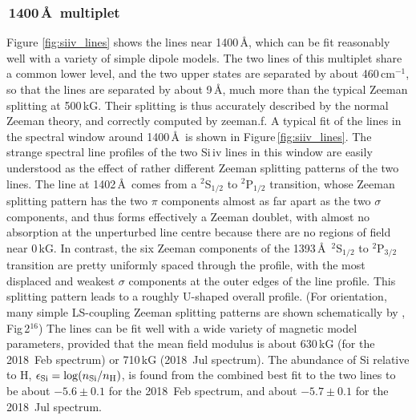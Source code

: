 \documentclass[fleqn,usenatbib]{mnras}
\begin{document}
\subsubsection{\,1400\,\AA\ multiplet}
\label{sec: siiv}
Figure \ref{fig:siiv_lines} shows the  lines near 1400\,\AA, which can be fit reasonably well with a variety of simple dipole models. The two lines of this multiplet share a common lower level, and the two upper states are separated by about 460\,cm$^{-1}$, so that the lines are separated by about 9\,\AA, much more than the typical Zeeman splitting at 500\,kG. Their splitting is thus accurately described by the normal Zeeman theory, and correctly computed by {\sc zeeman.f}. A typical fit of the lines in the spectral window around 1400\,\AA\ is shown in Figure\,\ref{fig:siiv_lines}. The strange spectral line profiles of the two Si\,{\sc iv} lines in this window are easily understood as the effect of rather different Zeeman splitting patterns of the two lines. The line at 1402\,\AA\ comes from a $^2$S$_{1/2}$ to $^2$P$_{1/2}$ transition, whose Zeeman splitting pattern has the two $\pi$ components almost as far apart as the two $\sigma$ components, and thus forms effectively a Zeeman doublet, with almost no absorption at the unperturbed line centre because there are no regions of field near 0\,kG. In contrast, the six Zeeman components of the 1393\,\AA\ $^2$S$_{1/2}$ to $^2$P$_{3/2}$ transition are pretty uniformly spaced through the profile, with the most displaced and weakest $\sigma$ components at the outer edges of the line profile.  This splitting pattern leads to a roughly U-shaped overall profile. (For orientation, many simple LS-coupling Zeeman splitting patterns are shown schematically by \citealt{condon+shortley35-1}, Fig\,2$^{16}$) The lines can be fit well with a wide variety of magnetic model parameters, provided that the mean field modulus is about 630\,kG (for the 2018~Feb spectrum) or 710\,kG (2018~Jul spectrum). The abundance of Si relative to H, $\epsilon_{\rm Si} = \log(n_{\rm Si}/n_{\rm H})$, is found from the combined best fit to the two lines to be about $-5.6 \pm 0.1$ for the 2018~Feb spectrum, and about $-5.7 \pm 0.1$ for the 2018~Jul spectrum.
\end{document}
